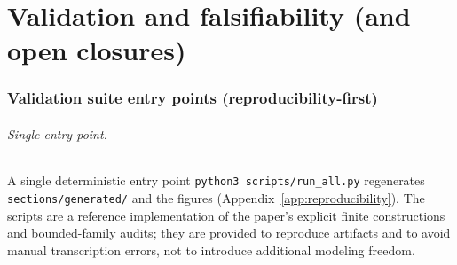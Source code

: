 \part{Validation and falsifiability (and open closures)}

\section*{Validation suite entry points (reproducibility-first)}
\label{sec:validation_entry_points}

\paragraph{Single entry point.}
\AuditTag A single deterministic entry point \texttt{python3 scripts/run\_all.py} regenerates \texttt{sections/generated/} and the figures (Appendix~\ref{app:reproducibility}).
The scripts are a reference implementation of the paper's explicit finite constructions and bounded-family audits; they are provided to reproduce artifacts and to avoid manual transcription errors, not to introduce additional modeling freedom.

